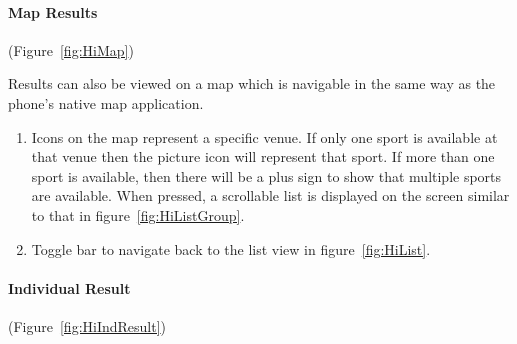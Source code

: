 
\paragraph{Map Results}

(Figure~\ref{fig:HiMap})


Results can also be viewed on a map which is navigable in the same
way as the phone's native map application.
\begin{enumerate}
	\item Icons on the map represent a specific venue. If only one sport is
		available at that venue then the picture icon will represent that
		sport. If more than one sport is available, then there will be a plus
		sign to show that multiple sports are available. When pressed, a
		scrollable list is displayed on the screen similar to that in
		figure~\ref{fig:HiListGroup}.
	\item Toggle bar to navigate back to the list view in
		figure~\ref{fig:HiList}.
\end{enumerate}

\paragraph{Individual Result}

(Figure~\ref{fig:HiIndResult})

